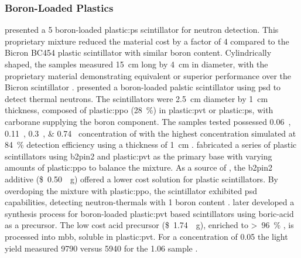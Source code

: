 \documentclass[../../../../main.tex]{subfiles}%
\begin{document}
%
    \subsubsection{Boron{\--}Loaded Plastics}%
    \label{sec:chapter-2:scintillator-detectors:plastics:boron-loaded}%
    \citeauthor*{Normand_2002} presented a \SI{5}{\percentweight} boron-loaded \gls{plastic:ps} scintillator for neutron detection.
    This proprietary mixture reduced the material cost by a factor of \num{4} compared to the Bicron BC454 plastic scintillator with similar boron content.
    Cylindrically shaped, the samples measured \SI{15}{\centi\meter} long by \SI{4}{\centi\meter} in diameter, with the proprietary material demonstrating equivalent or superior performance over the Bicron scintillator \cite{Normand_2002}.
    \citeauthor*{Pawelczak_2014} presented a boron-loaded palstic scintillator using \gls{psd} to detect thermal neutrons.
    The scintillators were \SI{2.5}{\centi\meter} diameter by \SI{1}{\centi\meter} thickness, composed of \gls{plastic:ppo} (\SI{28}{\percent}) in \gls{plastic:pvt} or \gls{plastic:ps}, with \gls{carborane} supplying the boron component.
    The samples tested possessed \SIlist{0.06;0.11;0.3;0.74}{\percentweight} concentration of  with the highest concentration simulated at \SI{84}{\percent} detection efficiency using a thickness of \SI{1}{\centi\meter} \cite{Pawelczak_2014}.
    \citeauthor*{Mahl_2016} fabricated a series of plastic scintillators using \gls{b2pin2} and \gls{plastic:pvt} as the primary base with varying amounts of \gls{plastic:ppo} to balance the mixture.
    As a source of , the \gls{b2pin2} additive (\SI[per-mode=symbol]{0.50}[\$]{\per\gram}) offered a lower cost solution for plastic scintillators.
    By overdoping the mixture with \gls{plastic:ppo}, the scintillator exhibited \gls{psd} capabilities, detecting \glspl{neutron-thermal} with \SI{1}{\percentweight} boron content \cite{Mahl_2016}.
    \citeauthor*{Mahl_2018} later developed a synthesis process for boron-loaded \gls{plastic:pvt} based scintillators using \gls{boric-acid} as a precursor.
    The low cost acid precursor (\SI[per-mode=symbol]{1.74}[\$]{\per\gram}), enriched to \SI{96}[>]{\percent} , is processed into \gls{mbb}, soluble in \gls{plastic:pvt}.
    For a  concentration of \SI{0.05}{\percentweight} the light yield measured \SI{9790}{\lightyield} versus \SI{5940}{\lightyield} for the \SI{1.06}{\percentweight} sample \cite{Mahl_2018}.
\end{document}
